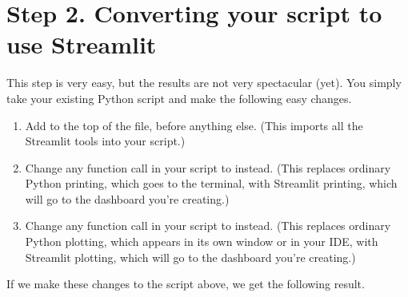\documentclass[letterpaper,10pt,english]{jupyterBook}
\begin{document}
\section{Step 2. Converting your script to use Streamlit}
\label{\detokenize{chapter-14-dashboards:step-2-converting-your-script-to-use-streamlit}}
\sphinxAtStartPar
This step is very easy, but the results are not very spectacular (yet).  You simply take your existing Python script and make the following easy changes.
\begin{enumerate}
%
\item {} 
\sphinxAtStartPar
Add  to the top of the file, before anything else.  (This imports all the Streamlit tools into your script.)

\item {} 
\sphinxAtStartPar
Change any  function call in your script to  instead.  (This replaces ordinary Python printing, which goes to the terminal, with Streamlit printing, which will go to the dashboard you’re creating.)

\item {} 
\sphinxAtStartPar
Change any  function call in your script to  instead.  (This replaces ordinary Python plotting, which appears in its own window or in your IDE, with Streamlit plotting, which will go to the dashboard you’re creating.)

\end{enumerate}

\sphinxAtStartPar
If we make these changes to the script above, we get the following result.
\end{document}
